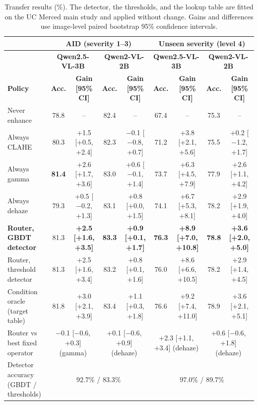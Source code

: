 \documentclass[lettersize,journal]{IEEEtran}
\begin{document}
\begin{table}[t]
\centering
\footnotesize
\caption{Transfer results (\%). The detector, the thresholds, and the lookup table are fitted on the UC Merced main study and applied without change. Gains and differences use image-level paired bootstrap 95\% confidence intervals.}
\label{tab:transfer}
\renewcommand{\arraystretch}{1.05}
\setlength{\tabcolsep}{3pt}
\begin{tabular}{|l|c|c|c|c|c|c|c|c|}
\hline
 & \multicolumn{4}{c|}{\textbf{AID (severity 1--3)}} & \multicolumn{4}{c|}{\textbf{Unseen severity (level 4)}} \\
\hline
 & \multicolumn{2}{c|}{\textbf{Qwen2.5-VL-3B}} & \multicolumn{2}{c|}{\textbf{Qwen2-VL-2B}} & \multicolumn{2}{c|}{\textbf{Qwen2.5-VL-3B}} & \multicolumn{2}{c|}{\textbf{Qwen2-VL-2B}} \\
\hline
\textbf{Policy} & \textbf{Acc.} & \textbf{Gain [95\% CI]} & \textbf{Acc.} & \textbf{Gain [95\% CI]} & \textbf{Acc.} & \textbf{Gain [95\% CI]} & \textbf{Acc.} & \textbf{Gain [95\% CI]} \\
\hline
Never enhance & 78.8 & -- & 82.4 & -- & 67.4 & -- & 75.3 & -- \\
Always CLAHE & 80.3 & +1.5 [+0.5, +2.4] & 82.3 & $-$0.1 [$-$0.8, +0.7] & 71.2 & +3.8 [+2.1, +5.6] & 75.5 & +0.2 [$-$1.2, +1.7] \\
Always gamma & \textbf{81.4} & +2.6 [+1.7, +3.6] & 83.0 & +0.6 [$-$0.1, +1.4] & 73.7 & +6.3 [+4.5, +7.9] & 77.9 & +2.6 [+1.1, +4.2] \\
Always dehaze & 79.3 & +0.5 [$-$0.2, +1.3] & 83.1 & +0.8 [+0.0, +1.5] & 74.1 & +6.7 [+5.3, +8.1] & 78.2 & +2.9 [+1.9, +4.0] \\
\hline
\textbf{Router, GBDT detector} & 81.3 & \textbf{+2.5 [+1.6, +3.5]} & \textbf{83.3} & \textbf{+0.9 [+0.1, +1.7]} & \textbf{76.3} & \textbf{+8.9 [+7.0, +10.8]} & \textbf{78.8} & \textbf{+3.6 [+2.0, +5.0]} \\
Router, threshold detector & 81.3 & +2.5 [+1.6, +3.4] & 83.2 & +0.8 [+0.1, +1.6] & 76.0 & +8.6 [+6.6, +10.5] & 78.2 & +2.9 [+1.4, +4.5] \\
\hline
Condition oracle (target table) & 81.8 & +3.0 [+2.1, +3.9] & 83.4 & +1.1 [+0.3, +1.8] & 76.6 & +9.2 [+7.4, +11.0] & 78.9 & +3.6 [+2.1, +5.1] \\
\hline
Router vs best fixed operator & \multicolumn{2}{c|}{$-$0.1 [$-$0.6, +0.3] (gamma)} & \multicolumn{2}{c|}{+0.1 [$-$0.6, +0.9] (dehaze)} & \multicolumn{2}{c|}{+2.3 [+1.1, +3.4] (dehaze)} & \multicolumn{2}{c|}{+0.6 [$-$0.6, +1.8] (dehaze)} \\
Detector accuracy (GBDT / thresholds) & \multicolumn{4}{c|}{92.7\% / 83.3\%} & \multicolumn{4}{c|}{97.0\% / 89.7\%} \\
\hline
\end{tabular}
\end{table}
\end{document}
